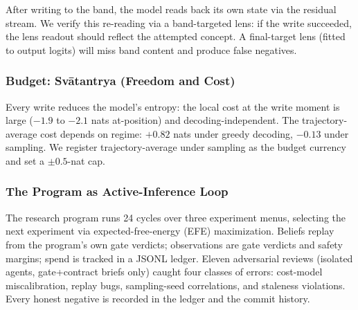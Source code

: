 After writing to the band, the model reads back its own state via the residual stream.
We verify this re-reading via a band-targeted lens: if the write succeeded, the lens readout should reflect
the attempted concept.
A final-target lens (fitted to output logits) will miss band content and produce false negatives.

\subsubsection*{Budget: Sv\=atantrya (Freedom and Cost)}

Every write reduces the model's entropy: the local cost at the write moment is large ($-1.9$ to $-2.1$ nats
at-position) and decoding-independent.
The trajectory-average cost depends on regime: $+0.82$ nats under greedy decoding, $-0.13$ under sampling.
We register trajectory-average under sampling as the budget currency and set a $\pm 0.5$-nat cap.

\subsubsection*{The Program as Active-Inference Loop}

The research program runs 24 cycles over three experiment menus, selecting the next experiment via
expected-free-energy (EFE) maximization.
Beliefs replay from the program's own gate verdicts; observations are gate verdicts and safety margins;
spend is tracked in a JSONL ledger.
Eleven adversarial reviews (isolated agents, gate+contract briefs only) caught four classes of errors:
cost-model miscalibration, replay bugs, sampling-seed correlations, and staleness violations.
Every honest negative is recorded in the ledger and the commit history.
